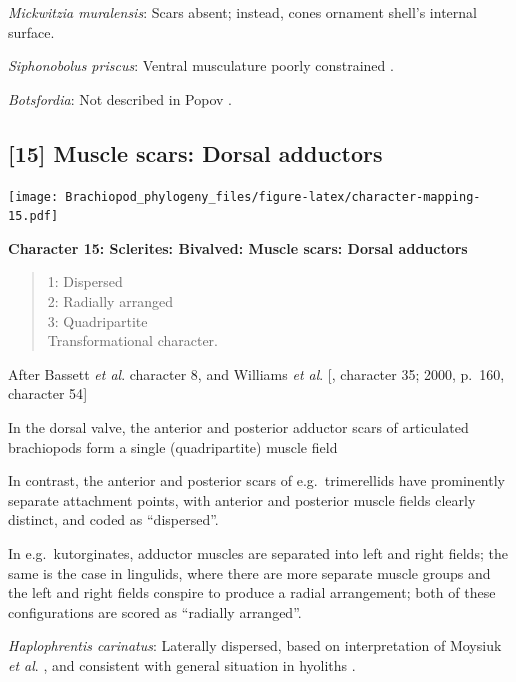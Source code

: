 \documentclass[]{book}
\theoremstyle{definition}
\theoremstyle{definition}
\theoremstyle{definition}
\theoremstyle{remark}
\begin{document}
\emph{Mickwitzia muralensis}: Scars absent; instead, cones ornament
shell's internal surface.

\emph{Siphonobolus priscus}: Ventral musculature poorly constrained
\citep{Williams2000BrachiopodaLinguliformea, Popov2009Earlyontogeny}.

\emph{Botsfordia}: Not described in Popov
\citeyearpar{Popov1992TheCambrian}.

\hypertarget{muscle-scars-dorsal-adductors}{%
\subsection*{{[}15{]} Muscle scars: Dorsal
adductors}\label{muscle-scars-dorsal-adductors}}

\texttt{[image: Brachiopod\_phylogeny\_files/figure-latex/character-mapping-15.pdf]}

\textbf{Character 15: Sclerites: Bivalved: Muscle scars: Dorsal
adductors}

\begin{quote}
1: Dispersed\\
2: Radially arranged\\
3: Quadripartite\\
Transformational character.
\end{quote}

After Bassett \emph{et al}.
\citeyearpar{Bassett2001Functionalmorphology} character 8, and Williams
\emph{et al}. {[}\citeyearpar{Williams1996Asupra}, character 35; 2000,
p.~160, character 54{]}

In the dorsal valve, the anterior and posterior adductor scars of
articulated brachiopods form a single (quadripartite) muscle field
\citep[p.~201]{Williams2000BrachiopodaLinguliformea}

In contrast, the anterior and posterior scars of e.g.~trimerellids have
prominently separate attachment points, with anterior and posterior
muscle fields clearly distinct, and coded as ``dispersed''.

In e.g.~kutorginates, adductor muscles are separated into left and right
fields; the same is the case in lingulids, where there are more separate
muscle groups and the left and right fields conspire to produce a radial
arrangement; both of these configurations are scored as ``radially
arranged''.

\emph{Haplophrentis carinatus}: Laterally dispersed, based on
interpretation of Moysiuk \emph{et al}.
\citeyearpar{Moysiuk2017Hyolithsare}, and consistent with general
situation in hyoliths \citep[see][]{Dzik1980Ontogenyof}.
\end{document}
